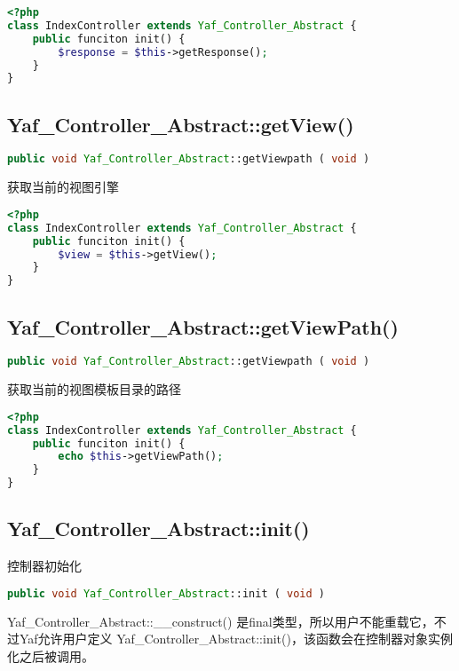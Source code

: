 \begin{lstlisting}[language=PHP]
<?php
class IndexController extends Yaf_Controller_Abstract {
    public funciton init() {
        $response = $this->getResponse();
    }
}
\end{lstlisting}

\subsection{Yaf\_Controller\_Abstract::getView()}

\begin{lstlisting}[language=PHP]
public void Yaf_Controller_Abstract::getViewpath ( void )
\end{lstlisting}

获取当前的视图引擎

\begin{lstlisting}[language=PHP]
<?php
class IndexController extends Yaf_Controller_Abstract {
    public funciton init() {
        $view = $this->getView();
    }
}
\end{lstlisting}

\subsection{Yaf\_Controller\_Abstract::getViewPath()}

\begin{lstlisting}[language=PHP]
public void Yaf_Controller_Abstract::getViewpath ( void )
\end{lstlisting}

获取当前的视图模板目录的路径

\begin{lstlisting}[language=PHP]
<?php
class IndexController extends Yaf_Controller_Abstract {
    public funciton init() {
        echo $this->getViewPath();
    }
}
\end{lstlisting}

\subsection{Yaf\_Controller\_Abstract::init()}

控制器初始化


\begin{lstlisting}[language=PHP]
public void Yaf_Controller_Abstract::init ( void )
\end{lstlisting}


Yaf\_Controller\_Abstract::\_\_construct() 是final类型，所以用户不能重载它，不过Yaf允许用户定义 Yaf\_Controller\_Abstract::init()，该函数会在控制器对象实例化之后被调用。





